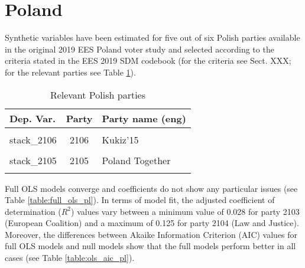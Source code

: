 \documentclass[
]{article}
\begin{document}
\hypertarget{poland}{%
\section{Poland}\label{poland}}

Synthetic variables have been estimated for five out of six Polish parties available in the original
2019 EES Poland voter study and selected according to the criteria stated in the EES 2019 SDM codebook (for the criteria see Sect. XXX; for the relevant parties see Table \ref{table:relprty_tab_pl}).

\begin{table}[!h]

\caption{\label{tab:unnamed-chunk-136}Relevant Polish parties \label{table:relprty_tab_pl}}
\centering
\begin{tabular}[t]{lcl}
\toprule
Dep. Var. & Party & Party name (eng)\\
\midrule
\cellcolor{gray!6}{stack\_2104} & \cellcolor{gray!6}{2104} & \cellcolor{gray!6}{Law and Justice}\\
stack\_2106 & 2106 & Kukiz'15\\
\cellcolor{gray!6}{stack\_2102} & \cellcolor{gray!6}{2102} & \cellcolor{gray!6}{Spring}\\
stack\_2105 & 2105 & Poland Together\\
\cellcolor{gray!6}{stack\_2103} & \cellcolor{gray!6}{2103} & \cellcolor{gray!6}{European Coalition}\\
\bottomrule
\end{tabular}
\end{table}

Full OLS models converge and coefficients do not show any particular issues (see Table
\ref{table:full_ols_pl}).
In terms of model fit, the adjusted coefficient of determination (\(R^2\)) values vary between
a minimum value of 0.028
for party 2103
(European Coalition)
and a maximum of 0.125
for party 2104
(Law and Justice).
Moreover, the differences between Akaike Information Criterion (AIC) values for full OLS models and null
models show that the full models perform better in all cases (see Table \ref{table:ols_aic_pl}).
\end{document}
